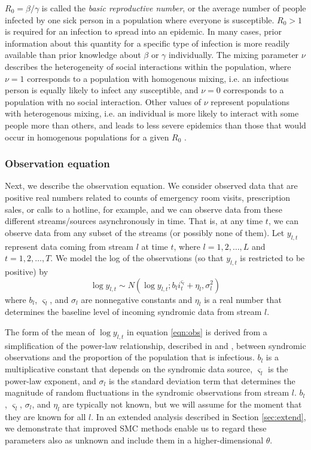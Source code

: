 \documentclass{elsarticle}
\begin{document}
$R_0 = \beta / \gamma$ is called the \emph{basic reproductive number}, or the average number of people infected by one sick person in a population where everyone is susceptible. $R_0 > 1$ is required for an infection to spread into an epidemic. In many cases, prior information about this quantity for a specific type of infection is more readily available than prior knowledge about $\beta$ or $\gamma$ individually. The mixing parameter $\nu$ describes the heterogeneity of social interactions within the population, where $\nu = 1$ corresponds to a population with homogenous mixing, i.e. an infectious person is equally likely to infect any susceptible, and $\nu = 0$ corresponds to a population with no social interaction. Other values of $\nu$ represent populations with heterogenous mixing, i.e. an individual is more likely to interact with some people more than others, and leads to less severe epidemics than those that would occur in homogenous populations for a given $R_0$ \citep{stroud2006powerlaw, novozhilov2008hetero}.

\subsubsection{Observation equation \label{sec:obs}}

Next, we describe the observation equation. We consider observed data that are positive real numbers related to counts of emergency room visits, prescription sales, or calls to a hotline, for example, and we can observe data from these different streams/sources asynchronously in time. That is, at any time $t$, we can observe data from any subset of the streams (or possibly none of them). Let $y_{l,t}$ represent data coming from stream $l$ at time $t$, where $l = 1,2,\ldots,L$ and $t = 1,2,\ldots,T$. We model the log of the observations (so that $y_{l,t}$ is restricted to be positive) by
\begin{equation}
\log y_{l,t} \sim N\left(\log y_{l,t};b_li_t^{\varsigma_l} + \eta_l,\sigma_l^2\right) \label{eqn:obs}
\end{equation}
where $b_l$, $\varsigma_l$, and $\sigma_l$ are nonnegative constants \citep{skvortsov2012monitoring} and $\eta_l$ is a real number that determines the baseline level of incoming syndromic data from stream $l$.

The form of the mean of $\log y_{l,t}$ in equation \eqref{eqn:obs} is derived from a simplification of the power-law relationship, described in \citet{skvortsov2012monitoring} and \citet{Gins:Mohe:Pate:Bram:Smol:Bril:dete:2009}, between syndromic observations and the proportion of the population that is infectious. $b_l$ is a multiplicative constant that depends on the syndromic data source, $\varsigma_l$ is the power-law exponent, and $\sigma_l$ is the standard deviation term that determines the magnitude of random fluctuations in the syndromic observations from stream $l$. $b_l$, $\varsigma_l$, $\sigma_l$, and $\eta_l$ are typically not known, but we will assume for the moment that they are known for all $l$. In an extended analysis described in Section \ref{sec:extend}, we demonstrate that improved SMC methods enable us to regard these parameters also as unknown and include them in a higher-dimensional $\theta$.
\end{document}
